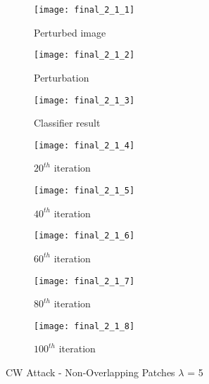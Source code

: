 \documentclass[11pt]{article}
\begin{document}
\begin{figure}[H]
\begin{subfigure}{.22\textwidth}
  \centering
  \texttt{[image: final\_2\_1\_1]}
  \caption{Perturbed image}
  \label{fig:}
\end{subfigure}
\begin{subfigure}{.22\textwidth}
  \centering
  \texttt{[image: final\_2\_1\_2]}
  \caption{Perturbation}
  \label{fig:}
\end{subfigure}
\begin{subfigure}{.22\textwidth}
  \centering
  \texttt{[image: final\_2\_1\_3]}
  \caption{Classifier result}
  \label{fig:}
\end{subfigure}
\begin{subfigure}{.22\textwidth}
  \centering
  \texttt{[image: final\_2\_1\_4]}
  \caption{$20^{th}$ iteration}
  \label{fig:}
\end{subfigure}

\begin{subfigure}{.22\textwidth}
  \centering
  \texttt{[image: final\_2\_1\_5]}
  \caption{$40^{th}$ iteration}
  \label{fig:}
\end{subfigure}
\begin{subfigure}{.22\textwidth}
  \centering
  \texttt{[image: final\_2\_1\_6]}
  \caption{$60^{th}$ iteration}
  \label{fig:}
\end{subfigure}
\begin{subfigure}{.22\textwidth}
  \centering
  \texttt{[image: final\_2\_1\_7]}
  \caption{$80^{th}$ iteration}
  \label{fig:}
\end{subfigure}
\begin{subfigure}{.22\textwidth}
  \centering
  \texttt{[image: final\_2\_1\_8]}
  \caption{$100^{th}$ iteration}
  \label{fig:}
\end{subfigure}

\caption{CW Attack - Non-Overlapping Patches $\lambda$ = 5}
\label{fig:}
\end{figure}
\end{document}
